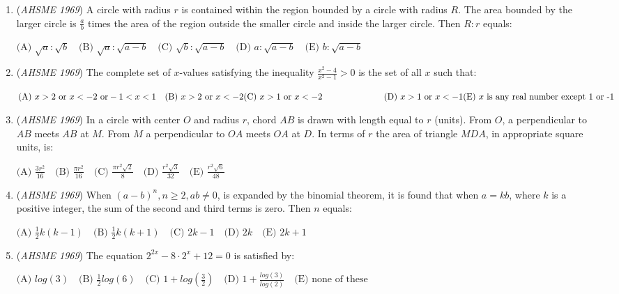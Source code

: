 \begin{enumerate}
	\item (\textit{AHSME 1969}) A circle with radius $r$ is contained within the region bounded by a circle with radius $R$. The area bounded by the larger circle is $\frac{a}{b}$ times the area of the region outside the smaller circle and inside the larger circle. Then $R:r$ equals:


 $\text{(A) }\sqrt{a}:\sqrt{b} \quad \text{(B) } \sqrt{a}:\sqrt{a-b}\quad \text{(C) } \sqrt{b}:\sqrt{a-b}\quad \text{(D) } a:\sqrt{a-b}\quad \text{(E) } b:\sqrt{a-b}$


	\item (\textit{AHSME 1969}) The complete set of $x$-values satisfying the inequality $\frac{x^2-4}{x^2-1}>0$ is the set of all $x$ such that:


 $\text{(A) } x>2 \text{ or } x<-2 \text{ or} -1<x<1\quad  \text{(B) } x>2 \text{ or } x<-2\quad \\ \text{(C) } x>1 \text{ or } x<-2\qquad\qquad\qquad\quad \text{(D) } x>1 \text{ or } x<-1\quad \\ \text{(E) } x \text{ is any real number except 1 or -1}$


	\item (\textit{AHSME 1969}) In a circle with center $O$ and radius $r$, chord $AB$ is drawn with length equal to $r$ (units). From $O$, a perpendicular to $AB$ meets $AB$ at $M$. From $M$ a perpendicular to $OA$ meets $OA$ at $D$. In terms of $r$ the area of triangle $MDA$, in appropriate square units, is:


 $\text{(A) } \frac{3r^2}{16}\quad \text{(B) } \frac{\pi r^2}{16}\quad \text{(C) } \frac{\pi r^2\sqrt{2}}{8}\quad \text{(D) } \frac{r^2\sqrt{3}}{32}\quad \text{(E) } \frac{r^2\sqrt{6}}{48}$


	\item (\textit{AHSME 1969}) When $(a-b)^n,n\ge2,ab\ne0$, is expanded by the binomial theorem, it is found that when $a=kb$, where $k$ is a positive integer, the sum of the second and third terms is zero. Then $n$ equals:


 $\text{(A) } \frac{1}{2}k(k-1)\quad \text{(B) } \frac{1}{2}k(k+1)\quad \text{(C) } 2k-1\quad \text{(D) } 2k\quad \text{(E) } 2k+1$


	\item (\textit{AHSME 1969}) The equation $2^{2x}-8\cdot 2^x+12=0$ is satisfied by:


 $\text{(A) } log(3)\quad \text{(B) } \frac{1}{2}log(6)\quad \text{(C) } 1+log(\frac{3}{2})\quad \text{(D) } 1+\frac{log(3)}{log(2)}\quad \text{(E) none of these}$



\end{enumerate}
